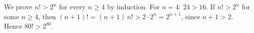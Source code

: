We prove $n!>2^n$ for every $n\ge4$ by induction. For $n=4$: $24>16$. If $n!>2^n$ for some $n\ge4$, then $(n+1)!=(n+1)\,n!>2\cdot2^n=2^{n+1}$, since $n+1>2$. Hence $\boxed{80!>2^{80}}$.
